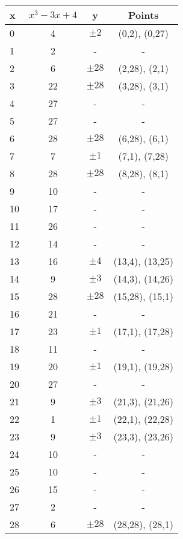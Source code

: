 \documentclass[11pt, pdftex]{article}
\begin{document}
\begin{center}
\begin{tabular}{|l|c|c|c|}
 \hline
x & $x^{3} - 3x + 4$ & y & Points \\
\hline
0 & 4 & $\pm2$ & (0,2), (0,27) \\
\hline
1 & 2 & - &  - \\
\hline
2 & 6 & $\pm28$ & (2,28), (2,1) \\
\hline
3 & 22 & $\pm28$ & (3,28), (3,1) \\
\hline
4 & 27 & - &  - \\
\hline
5 & 27 & - &  - \\
\hline
6 & 28 & $\pm28$ & (6,28), (6,1) \\
\hline
7 & 7 & $\pm1$ & (7,1), (7,28) \\
\hline
8 & 28 & $\pm28$ & (8,28), (8,1) \\
\hline
9 & 10 & - &  - \\
\hline
10 & 17 & - &  - \\
\hline
11 & 26 & - &  - \\
\hline
12 & 14 & - &  - \\
\hline
13 & 16 & $\pm4$ & (13,4), (13,25) \\
\hline
14 & 9 & $\pm3$ & (14,3), (14,26) \\
\hline
15 & 28 & $\pm28$ & (15,28), (15,1) \\
\hline
16 & 21 & - &  - \\
\hline
17 & 23 & $\pm1$ & (17,1), (17,28) \\
\hline
18 & 11 & - &  - \\
\hline
19 & 20 & $\pm1$ & (19,1), (19,28) \\
\hline
20 & 27 & - &  - \\
\hline
21 & 9 & $\pm3$ & (21,3), (21,26) \\
\hline
22 & 1 & $\pm1$ & (22,1), (22,28) \\
\hline
23 & 9 & $\pm3$ & (23,3), (23,26) \\
\hline
24 & 10 & - &  - \\
\hline
25 & 10 & - &  - \\
\hline
26 & 15 & - &  - \\
\hline
27 & 2 & - &  - \\
\hline
28 & 6 & $\pm28$ & (28,28), (28,1) \\
\hline
\end{tabular}
\end{center}
\end{document}

